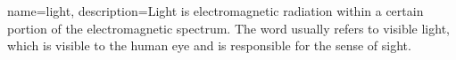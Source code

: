 {
    name=light,
    description={Light is electromagnetic radiation within a certain portion of the electromagnetic spectrum. The word usually refers to visible light, which is visible to the human eye and is responsible for the sense of sight.}
}
